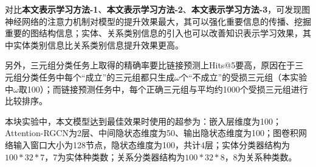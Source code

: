 对比\textbf{本文表示学习方法-1}、\textbf{本文表示学习方法-2}、\textbf{本文表示学习方法-3}，可发现图神经网络的注意力机制对模型的提升效果最大，其可以强化重要信息的传播、挖掘重要的图结构信息；实体、关系类别信息的引入也可以改善知识表示学习效果，其中实体类别信息比关系类别信息提升效果更高。

另外，三元组分类任务上取得的精确率要比链接预测上Hits@5要高，原因在于三元组分类任务中每个“成立”的三元组都只生成$\omega$个“不成立”的受损三元组（本实验中$\omega$取100）；而链接预测任务中，每个正确三元组与平均约1000个受损三元组进行比较排序。

本块实验中，本文模型达到最佳效果时使用的超参为：嵌入层维度为100；Attention-RGCN为2层、中间隐状态维度为50、输出隐状态维度为100；图卷积网络输入窗口大小为128节点，隐状态维度为100，共计4层；实体分类器结构为$100*32*7$，7为实体种类数；关系分类器结构为$100*32*8$，8为关系种类数。
